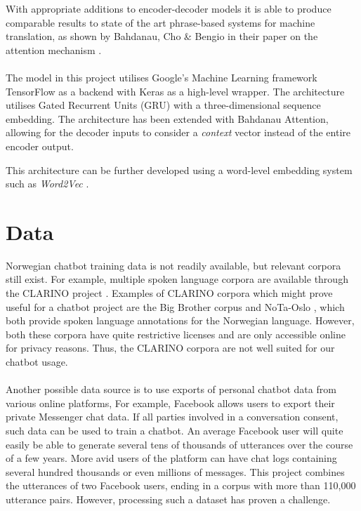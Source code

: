 \documentclass{article}
\begin{document}
With appropriate additions to encoder-decoder models it is able to produce
comparable results to state of the art phrase-based systems for machine
translation, as shown by Bahdanau, Cho \& Bengio in their paper on the attention
mechanism \cite{Bahdanau2015}.

\paragraph{}
The model in this project utilises Google's Machine Learning framework
TensorFlow as a backend with Keras as a high-level wrapper. The architecture
utilises Gated Recurrent Units (GRU) with a three-dimensional sequence
embedding. The architecture has been extended with Bahdanau Attention, allowing
for the decoder inputs to consider a \textit{context} vector instead of the
entire encoder output.

This architecture can be further developed using a word-level embedding system
such as \textit{Word2Vec} \cite{word2vec}.

\section*{Data}
Norwegian chatbot training data is not readily available, but relevant corpora
still exist.  For example, multiple spoken language corpora are available
through the CLARINO project \cite{clarino-about}. Examples of CLARINO
corpora which might prove useful for a chatbot project are the Big Brother
corpus \cite{clarino-bb} and NoTa-Oslo \cite{clarino-nota}, which both provide
spoken language annotations for the Norwegian language. However, both these
corpora have quite restrictive licenses and are only accessible online for
privacy reasons. Thus, the CLARINO corpora are not well suited for our chatbot
usage.

\paragraph{}
Another possible data source is to use exports of personal chatbot data from
various online platforms, For example, Facebook allows users to export their
private Messenger chat data. If all parties involved in a conversation consent,
such data can be used to train a chatbot. An average Facebook user will quite
easily be able to generate several tens of thousands of utterances over the
course of a few years. More avid users of the platform can have chat logs
containing several hundred thousands or even millions of messages. This project
combines the utterances of two Facebook users, ending in a corpus with more
than 110,000 utterance pairs. However, processing such a dataset has proven a
challenge.
\end{document}
